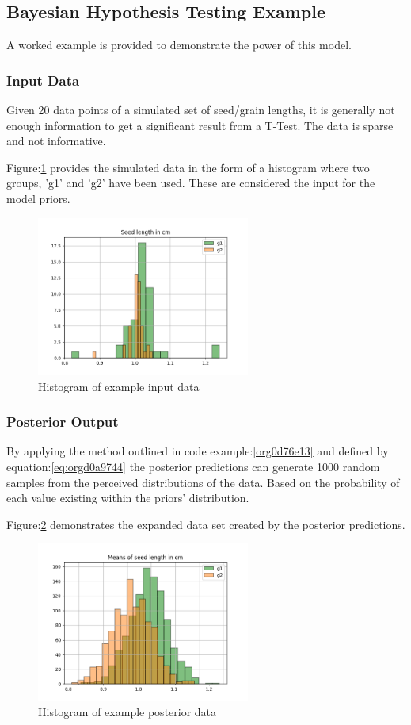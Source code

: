\documentclass[11pt]{report}
\begin{document}
\subsection{Bayesian Hypothesis Testing Example}
\label{sec:org5742d24}
A worked example is provided to demonstrate the power of this model.
\subsubsection{Input Data}
\label{sec:org1ac2602}
Given 20 data points of a simulated set of seed/grain lengths, it is generally not enough information to get a significant result from a T-Test. The data is sparse and not informative.

Figure:\ref{fig:org5e6f2b4} provides the simulated data in the form of a histogram where two groups, 'g1' and 'g2' have been used. These are considered the input for the model priors.
\begin{figure}[htbp]
\centering
\includegraphics[width=7cm]{./images/exampledata.png}
\caption{\label{fig:org5e6f2b4}
Histogram of example input data}
\end{figure}

\subsubsection{Posterior Output}
\label{sec:org8c141c2}
By applying the method outlined in code example:\ref{org0d76e13} and defined by equation:\ref{eq:orgd0a9744} the posterior predictions can generate 1000 random samples from the perceived distributions of the data. Based on the probability of each value existing within the priors' distribution.

Figure:\ref{fig:org22c10ad} demonstrates the expanded data set created by the posterior predictions.
\begin{figure}[htbp]
\centering
\includegraphics[width=7cm]{./images/examplebayes.png}
\caption{\label{fig:org22c10ad}
Histogram of example posterior data}
\end{figure}
\end{document}
